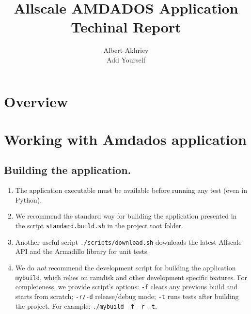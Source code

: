 \documentclass[]{article}
\title{Allscale AMDADOS Application \\ Techinal Report}
\author{Albert Akhriev \\ Add Yourself}
\begin{document}
\maketitle

\tableofcontents
\newpage

\section{Overview}



\section{Working with Amdados application}

\subsection{Building the application.}
\begin{enumerate}
\item The application executable must be available before running any test (even in Python).
\item We recommend the standard way for building the application presented in the script \texttt{standard.build.sh} in the project root folder.
\item Another useful script \texttt{./scripts/download.sh} downloads the latest \linebreak Allscale API and the Armadillo library for unit tests.
\item We do \textit{not} recommend the development script for building the application \texttt{mybuild}, which relies on ramdisk and other development specific features. For completeness, we provide script's options: \texttt{-f} clears any previous build and starts from scratch; \texttt{-r/-d} release/debug mode; \texttt{-t} runs tests after building the project. For example: \texttt{./mybuild -f -r -t}.
\end{enumerate}

\end{document}
